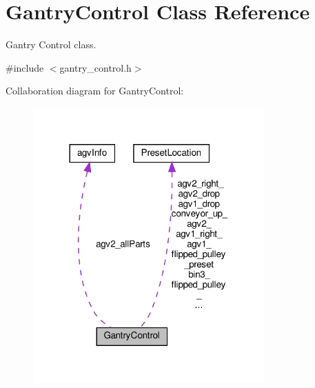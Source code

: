 \hypertarget{classGantryControl}{}\section{Gantry\+Control Class Reference}
\label{classGantryControl}


Gantry Control class.  




{\ttfamily \#include $<$gantry\+\_\+control.\+h$>$}



Collaboration diagram for Gantry\+Control\+:\nopagebreak
\begin{figure}[H]
\begin{center}
\leavevmode
\includegraphics[width=252pt]{classGantryControl__coll__graph}
\end{center}
\end{figure}
